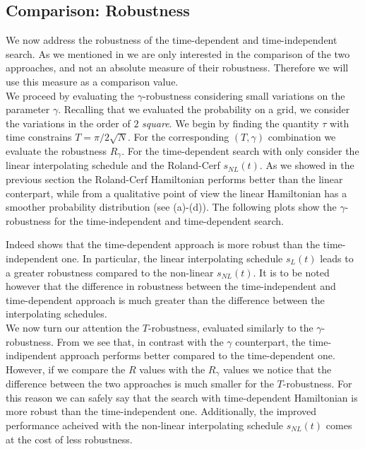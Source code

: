         \clearpage
    \subsection{Comparison: Robustness}\label{subsec:comparison_robustness}
    We now address the robustness of the time-dependent and time-independent search. As we mentioned in  we are only interested in the comparison of the two approaches, and not an absolute measure of their robustness. Therefore we will use this measure as a comparison value. \\
    We proceed by evaluating the $\gamma$-robustness considering small variations on the parameter $\gamma$. Recalling that we evaluated the probability on a grid, we consider the variations in the order of $2$ \textit{square}. We begin by finding the quantity $\tau$ with time constrains $T = \pi/2\sqrt{N}$. For the corresponding $(T,\gamma)$ combination we evaluate the robustness $R_\gamma$.
    For the time-dependent search with only consider the linear interpolating schedule and the Roland-Cerf $s_{NL}(t)$. As we showed in the previous section the Roland-Cerf Hamiltonian performs better than the linear conterpart, while from a qualitative point of view the linear Hamiltonian has a smoother probability distribution (see (a)-(d)). The following plots show the $\gamma$-robustness for the time-independent and time-dependent search.
    
    Indeed  shows that the time-dependent approach is more robust than the time-independent one. In particular, the linear interpolating schedule $s_L(t)$ leads to a greater robustness compared to the non-linear $s_{NL}(t)$. It is to be noted however that the difference in robustness between the time-independent and time-dependent approach is much greater than the difference between the interpolating schedules. \\

    \noindent
    We now turn our attention the $T$-robustness, evaluated similarly to the $\gamma$-robustness. From  we see that, in contrast with the $\gamma$ counterpart, the time-indipendent approach performs better compared to the time-dependent one. However, if we compare the $R$ values with the $R_\gamma$ values we notice that the difference between the two approaches is much smaller for the $T$-robustness. For this reason we can safely say that the search with time-dependent Hamiltonian is more robust than the time-independent one. Additionally, the improved performance acheived with the non-linear interpolating schedule $s_{NL}(t)$ comes at the cost of less robustness. 

    
